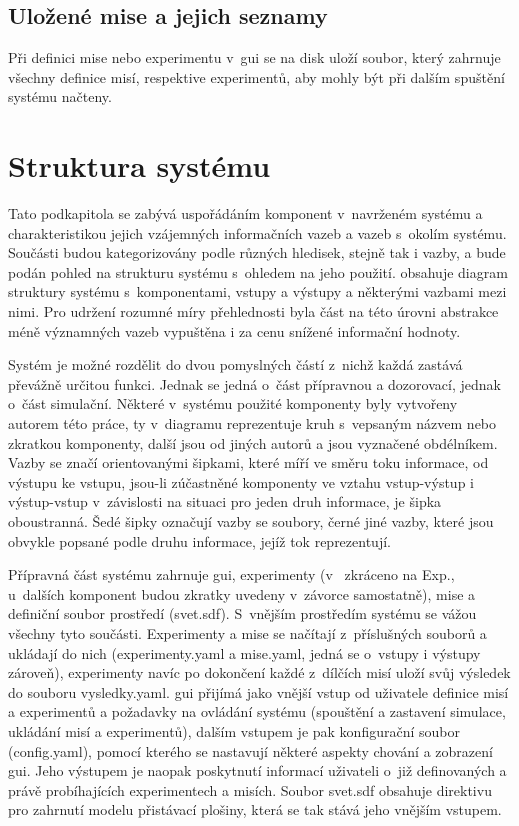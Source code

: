     \subsection{Uložené mise a jejich seznamy}
      Při definici mise nebo experimentu v~\acrshort{gui} se na disk uloží soubor, který zahrnuje všechny definice misí, respektive experimentů, aby mohly být při dalším spuštění systému načteny.
  \section{Struktura systému} \label{sec:structure}
    Tato podkapitola se zabývá uspořádáním komponent v~navrženém systému a charakteristikou jejich vzájemných informačních vazeb a vazeb s~okolím systému. Součásti budou kategorizovány podle různých hledisek, stejně tak i vazby, a bude podán pohled na strukturu systému s~ohledem na jeho použití.  obsahuje diagram struktury systému s~komponentami, vstupy a výstupy a některými vazbami mezi nimi. Pro udržení rozumné míry přehlednosti byla část na této úrovni abstrakce méně významných vazeb vypuštěna i za cenu snížené informační hodnoty.

    Systém je možné rozdělit do dvou pomyslných částí z~nichž každá zastává převážně určitou funkci. Jednak se jedná o~část přípravnou a dozorovací, jednak o~část simulační. Některé v~systému použité komponenty byly vytvořeny autorem této práce, ty v~diagramu reprezentuje kruh s~vepsaným názvem nebo zkratkou komponenty, další jsou od jiných autorů a jsou vyznačené obdélníkem. Vazby se značí orientovanými šipkami, které míří ve směru toku informace, od výstupu ke vstupu, jsou-li zúčastněné komponenty ve vztahu vstup-výstup i výstup-vstup v~závislosti na situaci pro jeden druh informace, je šipka oboustranná. Šedé šipky označují vazby se soubory, černé jiné vazby, které jsou obvykle popsané podle druhu informace, jejíž tok reprezentují.
    
    Přípravná část systému zahrnuje \acrshort{gui}, experimenty (v~ zkráceno na Exp., u~dalších komponent budou zkratky uvedeny v~závorce samostatně), mise a definiční soubor prostředí (svet.sdf). S~vnějším prostředím systému se vážou všechny tyto součásti. Experimenty a mise se načítají z~příslušných souborů a ukládají do nich (experimenty.yaml a mise.yaml, jedná se o~vstupy i výstupy zároveň), experimenty navíc po dokončení každé z~dílčích misí uloží svůj výsledek do souboru vysledky.yaml. \Acrshort{gui} přijímá jako vnější vstup od uživatele definice misí a experimentů a požadavky na ovládání systému (spouštění a zastavení simulace, ukládání misí a experimentů), dalším vstupem je pak konfigurační soubor (config.yaml), pomocí kterého se nastavují některé aspekty chování a zobrazení \acrshort{gui}. Jeho výstupem je naopak poskytnutí informací uživateli o~již definovaných a právě probíhajících experimentech a misích. Soubor svet.sdf obsahuje direktivu pro zahrnutí modelu přistávací plošiny, která se tak stává jeho vnějším vstupem.

